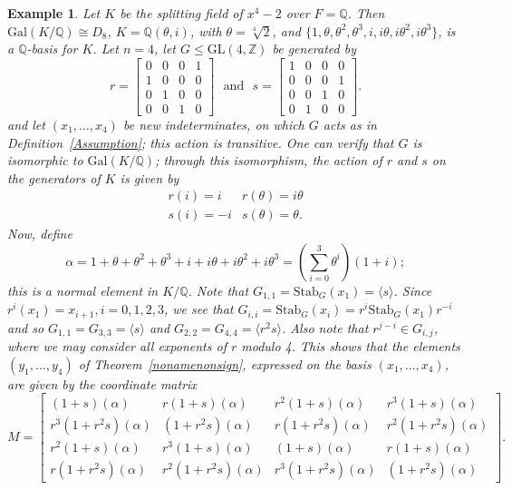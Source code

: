 \documentclass[12pt]{article}
\theoremstyle{plain}
\newtheorem{example}[theorem]{Example}
\newcommand{\Z}{\ensuremath{\mathbb{Z}}}
\newcommand{\Q}{\ensuremath{\mathbb{Q}}}
\begin{document}
\begin{example}
Let $K$ be the splitting field of $x^4-2$ over $F=\Q$. Then
$\mathrm{Gal}(K/\Q) \cong D_8$, $K = \Q(\theta,i)$, with $\theta =
\sqrt[4]{2}$, and $\lbrace 1, \theta, \theta^2, \theta^3, i, i\theta,
i\theta^2, i\theta^3\rbrace$, is a $\Q$-basis for $K$. Let
$n=4$, let
$G\leq \mathrm{GL}(4,\Z)$ be generated by
$$
r = \begin{bmatrix}
0&0&0&1\\
1&0&0&0\\
0&1&0&0\\
0&0&1&0
\end{bmatrix} \,\,\,\, \text{and}\,\,\,\,
s = \begin{bmatrix}
1&0&0&0\\
0&0&0&1\\
0&0&1&0\\
0&1&0&0
\end{bmatrix}.
$$ and let $(x_1,\dots,x_4)$ be new indeterminates, on which $G$ acts as in
Definition~\ref{Assumption}; this action is transitive. One can verify
that $G$ is isomorphic to $\mathrm{Gal}(K/\Q)$; through this isomorphism,
the action of $r$ and $s$ on the generators of $K$ is given by
$$
\begin{matrix}
r(i) = i &r(\theta) = i \theta \\
s(i) = -i & s(\theta) = \theta.
\end{matrix}
$$
Now, define $$\alpha = 1+ \theta + \theta^2 + \theta^3 +i + i\theta + i\theta^2 + i\theta^3=
(\sum_{i=0}^3\theta^i)(1+i);$$
this is a normal element in $K/\Q$. 
Note that $G_{1,1}=\mathrm{Stab}_G(x_1)=\langle s\rangle$. Since $r^i(x_1)=x_{i+1}, i=0,1,2,3$,
we see that $G_{i,i}=\mathrm{Stab}_G(x_i)=r^i \mathrm{Stab}_G(x_1)r^{-i}$ and so $G_{1,1}=G_{3,3}=\langle s\rangle$
and $G_{2,2}=G_{4,4}=\langle r^2s\rangle$. Also note that $r^{j-i}\in G_{i,j}$, where we may consider all exponents of 
$r$ modulo 4.
This shows that the elements $(y_1,\dots,y_4)$ of Theorem~\ref{nonamenonsign}, expressed 
on the basis $(x_1,\dots,x_4)$, are given by the coordinate matrix
$$
M= \begin{bmatrix}
(1+s)(\alpha) & r(1+s)(\alpha) & r^2(1+s)(\alpha) & r^3(1+s)(\alpha)\\
r^3(1+r^2s)(\alpha) & (1+r^2s)(\alpha) & r(1+r^2s)(\alpha) & r^2(1+r^2s)(\alpha)\\
r^2(1+s)(\alpha) & r^3(1+s)(\alpha) & (1+s)(\alpha) & r(1+s)(\alpha)\\
r(1+r^2s)(\alpha) & r^2(1+r^2s)(\alpha) & r^3(1+r^2s)(\alpha) & (1+r^2s)(\alpha)
\end{bmatrix}.
$$
\end{example}
\end{document}
